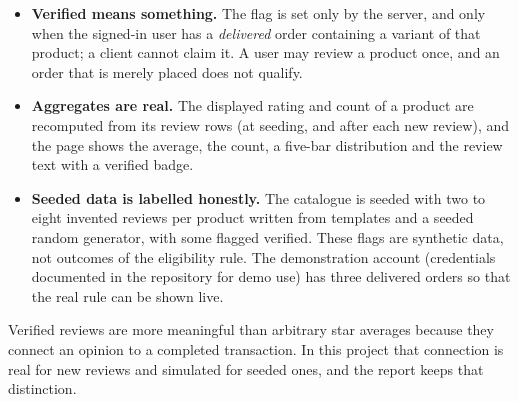 \begin{itemize}
\item \textbf{Verified means something.} The flag is set only by the server, and only when the signed-in user has a \emph{delivered} order containing a variant of that product; a client cannot claim it. A user may review a product once, and an order that is merely placed does not qualify. \tagtest{}
\item \textbf{Aggregates are real.} The displayed rating and count of a product are recomputed from its review rows (at seeding, and after each new review), and the page shows the average, the count, a five-bar distribution and the review text with a verified badge.
\item \textbf{Seeded data is labelled honestly.} The catalogue is seeded with two to eight invented reviews per product written from templates and a seeded random generator, with some flagged verified. These flags are synthetic data, not outcomes of the eligibility rule. The demonstration account (credentials documented in the repository for demo use) has three delivered orders so that the real rule can be shown live.
\end{itemize}

Verified reviews are more meaningful than arbitrary star averages because they connect an opinion to a completed transaction. In this project that connection is real for new reviews and simulated for seeded ones, and the report keeps that distinction.
